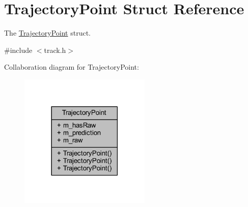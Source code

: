 \hypertarget{struct_trajectory_point}{}\section{Trajectory\+Point Struct Reference}
\label{struct_trajectory_point}


The \mbox{\hyperlink{struct_trajectory_point}{Trajectory\+Point}} struct.  




{\ttfamily \#include $<$track.\+h$>$}



Collaboration diagram for Trajectory\+Point\+:\nopagebreak
\begin{figure}[H]
\begin{center}
\leavevmode
\includegraphics[width=177pt]{struct_trajectory_point__coll__graph}
\end{center}
\end{figure}
